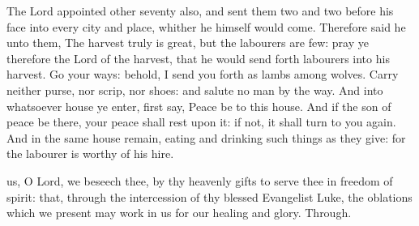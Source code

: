 
\vspace{-0.25\baselineskip}


\vspace{-0.1\baselineskip}

 The Lord appointed other seventy also, and sent them two and two before his face into every city and place, whither he himself would come. Therefore said he unto them, The harvest truly is great, but the labourers are few: pray ye therefore the Lord of the harvest, that he would send forth labourers into his harvest. Go your ways: behold, I send you forth as lambs among wolves. Carry neither purse, nor scrip, nor shoes: and salute no man by the way. And into whatsoever house ye enter, first say, Peace be to this house. And if the son of peace be there, your peace shall rest upon it: if not, it shall turn to you again. And in the same house remain, eating and drinking such things as they give: for the labourer is worthy of his hire.


\vspace{-0.25\baselineskip}

\secret

\vspace{-0.1\baselineskip}

 us, O Lord, we beseech thee, by thy heavenly gifts to serve thee in freedom of spirit: that, through the intercession of thy blessed Evangelist Luke, the oblations which we present may work in us for our healing and glory. Through.


\vspace{-0.25\baselineskip}

\postcommunion

\vspace{-0.15\baselineskip}

